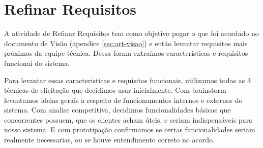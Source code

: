 \chapter{Refinar Requisitos}
\label{sec:refinar-req}

A atividade de Refinar Requisitos tem como objetivo pegar o que foi acordado no documento de Visão (apendice \ref{sec:art-visao}) e então levantar requisitos mais próximos da equipe técnica. Dessa forma extraímos características e requisitos funcionai do sistema.

Para levantar essas caracteristicas e requisitos funcionais, utilizamos todas as 3 técnicas de elicitação que decidimos usar inicialmente. Com brainstorm levantamos ideias gerais a respeito de funcionamentos internos e externos do sistema. Com analise competitiva, decidimos funcionalidades básicas que concorrentes possuem, que os clientes acham úteis, e seriam indispensáveis para nosso sistema. E com prototipação confirmamos se certas funcionalidades seriam realmente necessarias, ou se houve entendimento correto no acordo.

\label{sec:carac}

